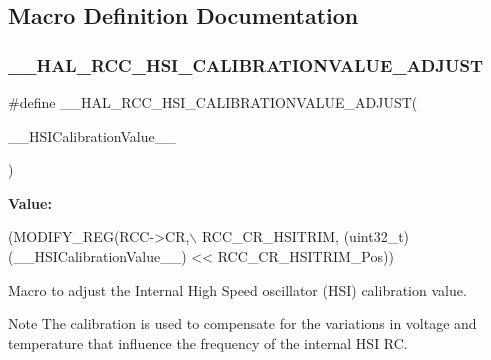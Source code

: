 \subsection{Macro Definition Documentation}
\mbox{\label{group___r_c_c___h_s_i___configuration_ga7bccced288554b8598110b465701fad0}} 
\subsubsection{\texorpdfstring{\+\_\+\+\_\+\+H\+A\+L\+\_\+\+R\+C\+C\+\_\+\+H\+S\+I\+\_\+\+C\+A\+L\+I\+B\+R\+A\+T\+I\+O\+N\+V\+A\+L\+U\+E\+\_\+\+A\+D\+J\+U\+ST}{\_\_HAL\_RCC\_HSI\_CALIBRATIONVALUE\_ADJUST}}
{\footnotesize\ttfamily \#define \+\_\+\+\_\+\+H\+A\+L\+\_\+\+R\+C\+C\+\_\+\+H\+S\+I\+\_\+\+C\+A\+L\+I\+B\+R\+A\+T\+I\+O\+N\+V\+A\+L\+U\+E\+\_\+\+A\+D\+J\+U\+ST(\begin{DoxyParamCaption}\item[{}]{\+\_\+\+\_\+\+H\+S\+I\+Calibration\+Value\+\_\+\+\_\+ }\end{DoxyParamCaption})}

{\bfseries Value\+:}
\begin{DoxyCode}
(MODIFY\_REG(RCC->CR,\(\backslash\)
        RCC\_CR\_HSITRIM, (uint32\_t)(\_\_HSICalibrationValue\_\_) << RCC\_CR\_HSITRIM\_Pos))
\end{DoxyCode}


Macro to adjust the Internal High Speed oscillator (H\+SI) calibration value. 

\begin{DoxyNote}{Note}
The calibration is used to compensate for the variations in voltage and temperature that influence the frequency of the internal H\+SI RC. 
\end{DoxyNote}

